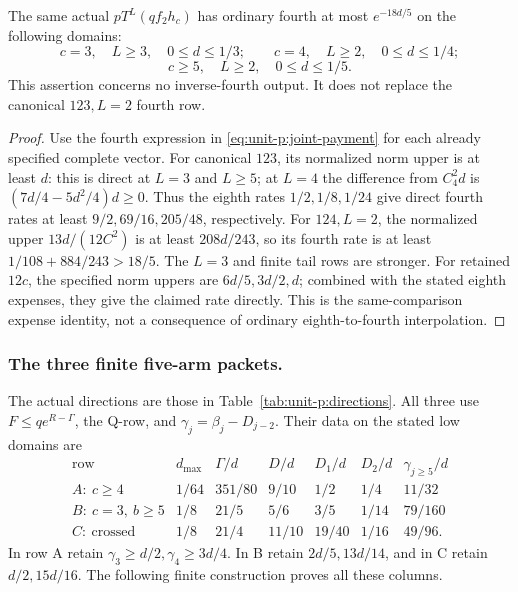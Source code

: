 \begin{corollary}\label{cor:unit-p:shortest-two-fourth}
The same actual \(pT^L(qf_2h_c)\) has ordinary fourth at most
\(e^{-18d/5}\) on the following domains:
\[
 c=3,\quad L\ge3,\quad 0\le d\le1/3;\qquad
 c=4,\quad L\ge2,\quad 0\le d\le1/4;
\]
\[
 c\ge5,\quad L\ge2,\quad0\le d\le1/5 .
\]
This assertion concerns no inverse-fourth output. It does not
replace the canonical \(123,L=2\) fourth row.
\end{corollary}
\begin{proof}
Use the fourth expression in \eqref{eq:unit-p:joint-payment}
for each already specified complete vector.
For canonical \(123\), its normalized norm upper is at least
\(d\): this is direct at \(L=3\) and \(L\ge5\); at \(L=4\)
the difference from \(C_4^2d\) is
\((7d/4-5d^2/4)d\ge0\).
Thus the eighth rates \(1/2,1/8,1/24\) give direct fourth
rates at least \(9/2,69/16,205/48\), respectively.
For \(124,L=2\), the normalized upper \(13d/(12C^2)\) is at
least \(208d/243\), so its fourth rate is at least
\(1/108+884/243>18/5\).
The \(L=3\) and finite tail rows are stronger.
For retained \(12c\), the specified norm uppers are
\(6d/5,3d/2,d\); combined with the stated eighth expenses,
they give the claimed rate directly.
This is the same-comparison expense identity, not a consequence
of ordinary eighth-to-fourth interpolation.
\end{proof}

\subsubsection{The three finite five-arm packets.}\label{part:unit-p:five-arms}
The actual directions are those in Table~\ref{tab:unit-p:directions}.
All three use \(F\le qe^{R-\Gamma}\), the Q-row, and
\(\gamma_j=\beta_j-D_{j-2}\).
Their data on the stated low domains are
\begin{equation}\label{eq:unit-p:data-21}
\begin{array}{c|c|c|c|c|c|c}
 \text{row}&d_{\max}&\Gamma/d&D/d&D_1/d&D_2/d&
                          \gamma_{j\ge5}/d\\\hline
 A:\ c\ge4&1/64&351/80&9/10&1/2&1/4&11/32\\
 B:\ c=3,\ b\ge5&1/8&21/5&5/6&3/5&1/14&79/160\\
 C:\ \text{crossed}&1/8&21/4&11/10&19/40&1/16&49/96 .
\end{array}
\end{equation}
In row A retain
\(\gamma_3\ge d/2,\gamma_4\ge3d/4\).
In B retain \(2d/5,13d/14\), and in C retain \(d/2,15d/16\).
The following finite construction proves all these columns.

